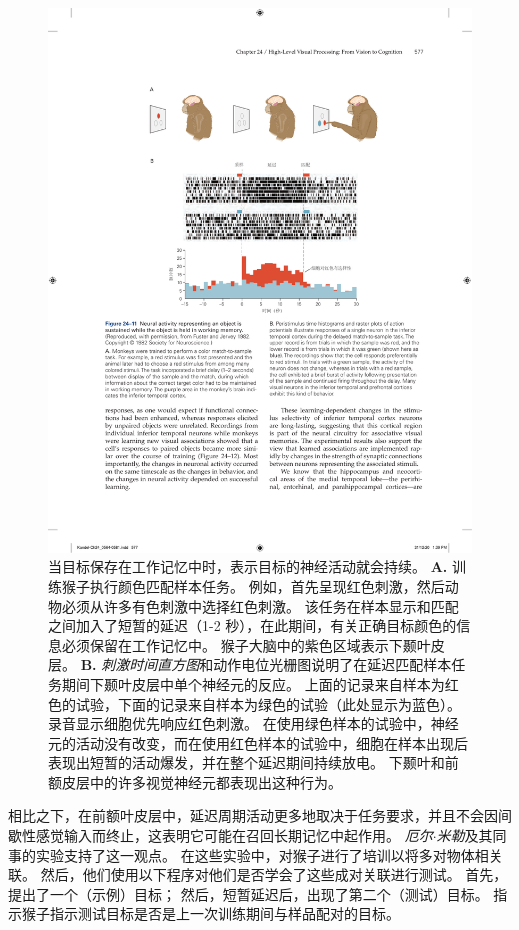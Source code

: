 \begin{figure}[htbp]
	\centering
	\includegraphics[width=1.0\linewidth]{chap24/fig_24_11}
	\caption{当目标保存在工作记忆中时，表示目标的神经活动就会持续。 
		\textbf{A.} 训练猴子执行颜色匹配样本任务。
		例如，首先呈现红色刺激，然后动物必须从许多有色刺激中选择红色刺激。
		该任务在样本显示和匹配之间加入了短暂的延迟（1-2 秒），在此期间，有关正确目标颜色的信息必须保留在工作记忆中。
		猴子大脑中的紫色区域表示下颞叶皮层。
		\textbf{B.} \textit{刺激时间直方图}和动作电位光栅图说明了在延迟匹配样本任务期间下颞叶皮层中单个神经元的反应。
		上面的记录来自样本为红色的试验，下面的记录来自样本为绿色的试验（此处显示为蓝色）。
		录音显示细胞优先响应红色刺激。
		在使用绿色样本的试验中，神经元的活动没有改变，而在使用红色样本的试验中，细胞在样本出现后表现出短暂的活动爆发，并在整个延迟期间持续放电。
		下颞叶和前额皮层中的许多视觉神经元都表现出这种行为。}
	\label{fig:24_11}
\end{figure}


相比之下，在前额叶皮层中，延迟周期活动更多地取决于任务要求，并且不会因间歇性感觉输入而终止，这表明它可能在召回长期记忆中起作用。
\textit{厄尔$\cdot$米勒}及其同事的实验支持了这一观点。
在这些实验中，对猴子进行了培训以将多对物体相关联。 
然后，他们使用以下程序对他们是否学会了这些成对关联进行测试。
首先，提出了一个（示例）目标； 然后，短暂延迟后，出现了第二个（测试）目标。
指示猴子指示测试目标是否是上一次训练期间与样品配对的目标。


